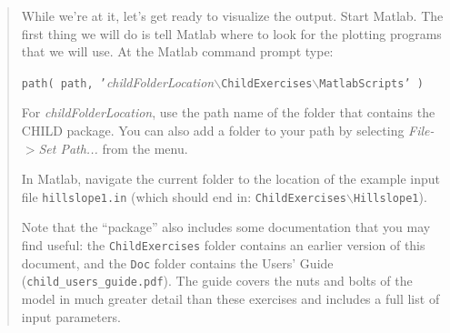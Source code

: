 \documentclass[12pt,reqno]{amsart}
\begin{document}
\begin{quote}
{While we're at it, let's get ready to visualize the output. Start Matlab. The first thing we will do is tell Matlab where to look for the plotting programs that we will use. At the Matlab command prompt type:

{\tt path( path, '}{\em childFolderLocation}{\tt $\backslash$ChildExercises$\backslash$MatlabScripts' )}

\noindent 
For {\em childFolderLocation}, use the path name of the folder that contains the CHILD package. You can also add a folder to your path by selecting {\em File-$>$Set Path...} from the menu.

In Matlab, navigate the current folder to the location of the example input file {\tt hillslope1.in} (which should end in: {\tt ChildExercises$\backslash$Hillslope1}).

Note that the ``package'' also includes some documentation that you
may find useful: the {\tt ChildExercises} folder contains an earlier
version of this document, and the {\tt Doc} folder contains the Users' Guide ({\tt child\_users\_guide.pdf}). The guide covers the nuts and bolts of the model
in much greater detail than these exercises and includes a full list of
input parameters.}
\end{quote}
\end{document}
